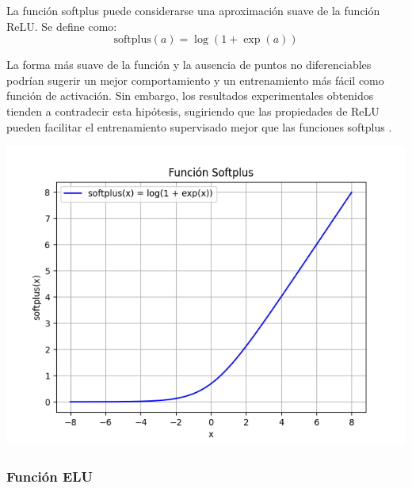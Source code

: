 \begin{minipage}{0.6\textwidth}
    La función softplus puede considerarse una aproximación suave de la función ReLU. Se define como:
\begin{equation}
\text{softplus}(a) = \log(1 + \exp(a))
\end{equation}

La forma más suave de la función y la ausencia de puntos no diferenciables podrían sugerir un mejor comportamiento y un entrenamiento más fácil como función de activación. Sin embargo, los resultados experimentales obtenidos tienden a contradecir esta hipótesis, sugiriendo que las propiedades de ReLU pueden facilitar el entrenamiento supervisado mejor que las funciones softplus \citep{apicella2021survey}.
\end{minipage}
\begin{minipage}{0.05\textwidth}
\textbf{ }
\end{minipage}
\begin{minipage}{0.35\textwidth}
    \includegraphics[width=1.1\textwidth]{img/softplus.png}
    \label{img:softplus}
\end{minipage}


\subsubsection*{Función ELU}

